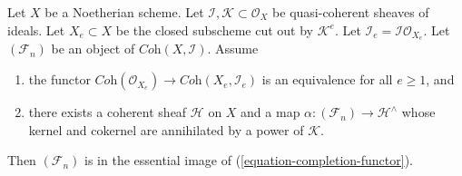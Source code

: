 \begin{lemma}
\label{lemma-existence-tricky}
Let $X$ be a Noetherian scheme. Let
$\mathcal{I}, \mathcal{K} \subset \mathcal{O}_X$
be quasi-coherent sheaves of ideals.
Let $X_e \subset X$ be the closed subscheme cut out by $\mathcal{K}^e$.
Let $\mathcal{I}_e = \mathcal{I}\mathcal{O}_{X_e}$.
Let $(\mathcal{F}_n)$ be an object of $\textit{Coh}(X, \mathcal{I})$.
Assume
\begin{enumerate}
\item the functor
$\textit{Coh}(\mathcal{O}_{X_e}) \to \textit{Coh}(X_e, \mathcal{I}_e)$
is an equivalence for all $e \geq 1$, and
\item there exists a coherent sheaf $\mathcal{H}$ on $X$ and a map
$\alpha : (\mathcal{F}_n) \to \mathcal{H}^\wedge$ whose
kernel and cokernel are annihilated by a power of $\mathcal{K}$.
\end{enumerate}
Then $(\mathcal{F}_n)$ is in the essential image of
(\ref{equation-completion-functor}).
\end{lemma}


